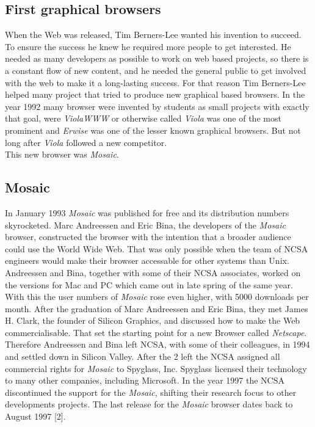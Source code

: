 \documentclass[runningheads]{llncs}
\begin{document}
		\subsection{First graphical browsers}
		When the Web was released, Tim Berners-Lee wanted his invention to succeed. To ensure the success he knew he required more people to get interested. He needed as many developers as possible to work on web based projects, so there is a constant flow of new content, and he needed the general public to get involved with the web to make it a long-lasting success. For that reason Tim Berners-Lee helped many project that tried to produce new graphical based browsers. In the year 1992 many browser were invented by students as small projects with exactly that goal, were \textit{ViolaWWW} or otherwise called \textit{Viola} was one of the most prominent and \textit{Erwise} was one of the lesser known graphical browsers. But not long after \textit{Viola} followed a new competitor. \\This new browser was \textit{Mosaic}.
		\subsection{Mosaic}
		In January 1993 \textit{Mosaic} was published for free and its distribution numbers skyrocketed. Marc Andreessen and Eric Bina, the developers of the \textit{Mosaic} browser, constructed the browser with the intention that a broader audience could use the World Wide Web. That was only possible when the team of NCSA engineers would make their browser accessable for other systems than Unix. Andreessen and Bina, together with some of their NCSA associates, worked on the versions for Mac and PC which came out in late spring of the same year. With this the user numbers of \textit{Mosaic} rose even higher, with 5000 downloads per month. After the graduation of Marc Andreessen and Eric Bina, they met James H. Clark, the founder of Silicon Graphics, and discussed how to make the Web commercialisable. That set the starting point for a new Browser called \textit{Netscape}. Therefore Andreessen and Bina left NCSA, with some of their colleagues, in 1994 and settled down in Silicon Valley. After the 2 left the NCSA assigned all commercial rights for \textit{Mosaic} to Spyglass, Inc. Spyglass licensed their technology to many other companies, including Microsoft. In the year 1997 the NCSA discontinued the support for the \textit{Mosaic}, shifting their research focus to other developments projects. The last release for the \textit{Mosaic} browser dates back to August 1997 [2].
\end{document}

